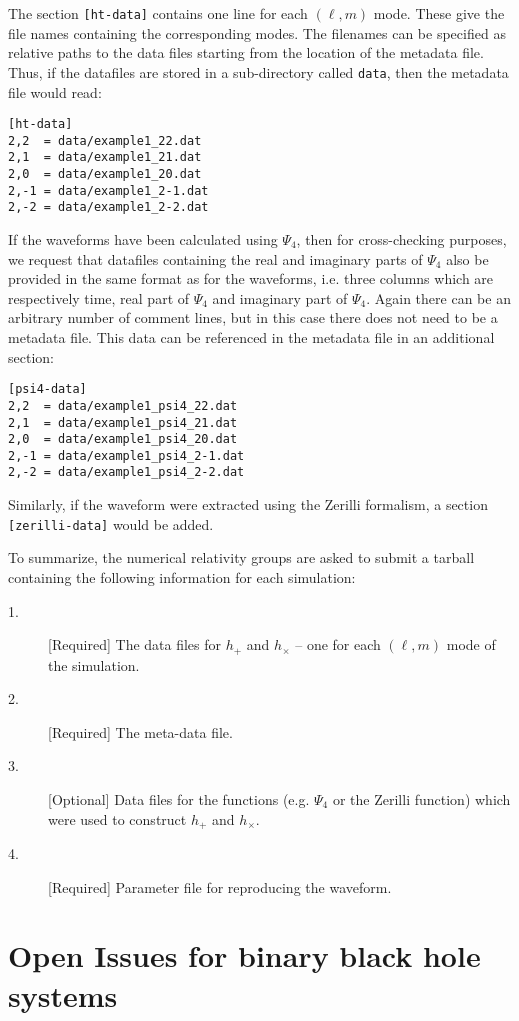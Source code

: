 \documentclass[prd,preprintnumbers,superscriptaddress,eqsecnum]{revtex4}
\numberwithin{equation}{section}
\begin{document}
The section \texttt{[ht-data]} contains one line for each $(\ell,m)$
mode.  These give the file names containing the corresponding modes.
The filenames can be specified as relative paths to the data files
starting from the location of the metadata file.  Thus, if the
datafiles are stored in a sub-directory called \texttt{data}, then the
metadata file would read:
\begin{verbatim}
[ht-data]
2,2  = data/example1_22.dat
2,1  = data/example1_21.dat
2,0  = data/example1_20.dat
2,-1 = data/example1_2-1.dat
2,-2 = data/example1_2-2.dat
\end{verbatim}

If the waveforms have been calculated using $\Psi_4$, then for
cross-checking purposes, we request that datafiles containing the real
and imaginary parts of $\Psi_4$ also be provided in the same format as
for the waveforms, i.e. three columns which are respectively time, real
part of $\Psi_4$ and imaginary part of $\Psi_4$.  Again there can be an
arbitrary number of comment lines, but in this case there does not need
to be a metadata file.  This data can be referenced in the metadata
file in an additional section:

\begin{verbatim}
[psi4-data]
2,2  = data/example1_psi4_22.dat
2,1  = data/example1_psi4_21.dat
2,0  = data/example1_psi4_20.dat
2,-1 = data/example1_psi4_2-1.dat
2,-2 = data/example1_psi4_2-2.dat
\end{verbatim}

Similarly, if the waveform were extracted using the Zerilli formalism, a
section \texttt{[zerilli-data]} would be added.

To summarize, the numerical relativity groups are asked to submit a
tarball containing the following information for each simulation:
\begin{description}
\item[1.][Required] The data files for $h_+$ and $h_\times$ -- one for
  each $(\ell,m)$ mode of the simulation.
\item[2.][Required] The meta-data file.
\item[3.][Optional] Data files for the functions (e.g. $\Psi_4$ or the
  Zerilli function) which were used to construct $h_{+}$ and $h_{\times}$.
\item[4.][Required] Parameter file for reproducing the waveform.
\end{description}




\section{Open Issues for binary black hole systems}
\label{sec:openissues}
\end{document}
